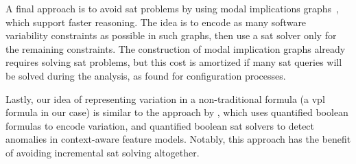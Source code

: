 A final approach is to avoid \ac{sat} problems by using modal implications
graphs~\citep{KTS+:ICSE18}, which support faster reasoning. The idea is to
encode as many software variability constraints as possible in such graphs,
then use a \ac{sat} solver only for the remaining constraints.
%
The construction of modal implication graphs already requires solving \ac{sat}
problems, but this cost is amortized if many \ac{sat} queries will be solved
during the analysis, as \citet{KTS+:ICSE18} found for configuration processes.

Lastly, our idea of representing variation in a non-traditional formula (a
\ac{vpl} formula in our case) is similar to the approach by
\cite{10.1145/3442391.3442405}, which uses quantified boolean formulas to encode
variation, and quantified boolean \ac{sat} solvers to detect anomalies in
context-aware feature models. Notably, this approach has the benefit of avoiding
incremental \ac{sat} solving altogether.



